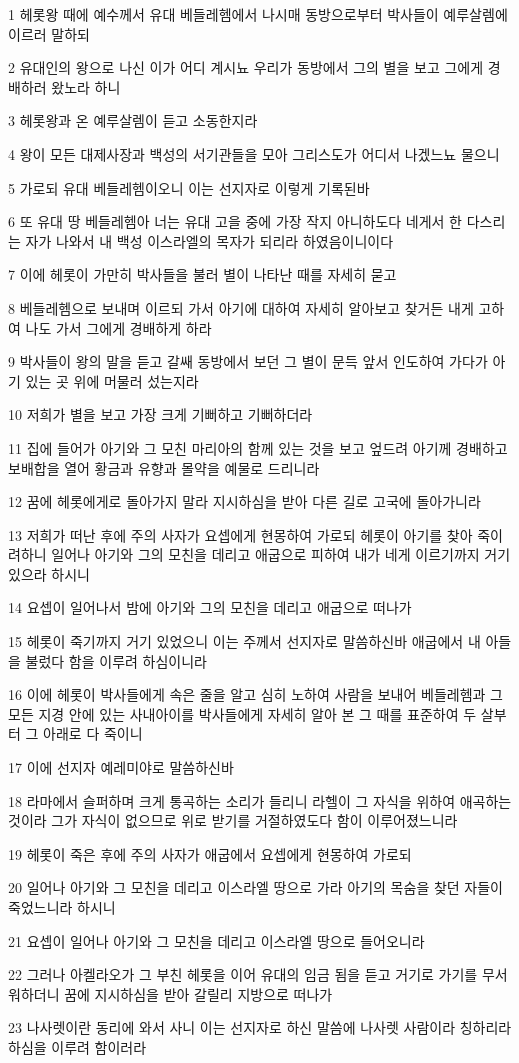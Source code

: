\par 1 헤롯왕 때에 예수께서 유대 베들레헴에서 나시매 동방으로부터 박사들이 예루살렘에 이르러 말하되
\par 2 유대인의 왕으로 나신 이가 어디 계시뇨 우리가 동방에서 그의 별을 보고 그에게 경배하러 왔노라 하니
\par 3 헤롯왕과 온 예루살렘이 듣고 소동한지라
\par 4 왕이 모든 대제사장과 백성의 서기관들을 모아 그리스도가 어디서 나겠느뇨 물으니
\par 5 가로되 유대 베들레헴이오니 이는 선지자로 이렇게 기록된바
\par 6 또 유대 땅 베들레헴아 너는 유대 고을 중에 가장 작지 아니하도다 네게서 한 다스리는 자가 나와서 내 백성 이스라엘의 목자가 되리라 하였음이니이다
\par 7 이에 헤롯이 가만히 박사들을 불러 별이 나타난 때를 자세히 묻고
\par 8 베들레헴으로 보내며 이르되 가서 아기에 대하여 자세히 알아보고 찾거든 내게 고하여 나도 가서 그에게 경배하게 하라
\par 9 박사들이 왕의 말을 듣고 갈쌔 동방에서 보던 그 별이 문득 앞서 인도하여 가다가 아기 있는 곳 위에 머물러 섰는지라
\par 10 저희가 별을 보고 가장 크게 기뻐하고 기뻐하더라
\par 11 집에 들어가 아기와 그 모친 마리아의 함께 있는 것을 보고 엎드려 아기께 경배하고 보배합을 열어 황금과 유향과 몰약을 예물로 드리니라
\par 12 꿈에 헤롯에게로 돌아가지 말라 지시하심을 받아 다른 길로 고국에 돌아가니라
\par 13 저희가 떠난 후에 주의 사자가 요셉에게 현몽하여 가로되 헤롯이 아기를 찾아 죽이려하니 일어나 아기와 그의 모친을 데리고 애굽으로 피하여 내가 네게 이르기까지 거기 있으라 하시니
\par 14 요셉이 일어나서 밤에 아기와 그의 모친을 데리고 애굽으로 떠나가
\par 15 헤롯이 죽기까지 거기 있었으니 이는 주께서 선지자로 말씀하신바 애굽에서 내 아들을 불렀다 함을 이루려 하심이니라
\par 16 이에 헤롯이 박사들에게 속은 줄을 알고 심히 노하여 사람을 보내어 베들레헴과 그 모든 지경 안에 있는 사내아이를 박사들에게 자세히 알아 본 그 때를 표준하여 두 살부터 그 아래로 다 죽이니
\par 17 이에 선지자 예레미야로 말씀하신바
\par 18 라마에서 슬퍼하며 크게 통곡하는 소리가 들리니 라헬이 그 자식을 위하여 애곡하는 것이라 그가 자식이 없으므로 위로 받기를 거절하였도다 함이 이루어졌느니라
\par 19 헤롯이 죽은 후에 주의 사자가 애굽에서 요셉에게 현몽하여 가로되
\par 20 일어나 아기와 그 모친을 데리고 이스라엘 땅으로 가라 아기의 목숨을 찾던 자들이 죽었느니라 하시니
\par 21 요셉이 일어나 아기와 그 모친을 데리고 이스라엘 땅으로 들어오니라
\par 22 그러나 아켈라오가 그 부친 헤롯을 이어 유대의 임금 됨을 듣고 거기로 가기를 무서워하더니 꿈에 지시하심을 받아 갈릴리 지방으로 떠나가
\par 23 나사렛이란 동리에 와서 사니 이는 선지자로 하신 말씀에 나사렛 사람이라 칭하리라 하심을 이루려 함이러라

